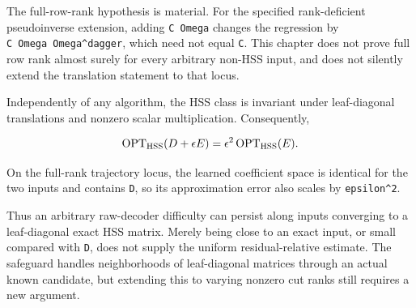 \documentclass[11pt,oneside,openany,a4paper]{book}
\numberwithin{equation}{chapter}
\theoremstyle{definition}
\theoremstyle{remark}
\newcommand{\proofstep}[1]{\par\addvspace{.45\baselineskip}\Needspace{3\baselineskip}\textbf{#1}\par\nobreak}
\newcommand{\R}{\mathbb R}\newcommand{\E}{\mathbb E}\newcommand{\Prb}{\mathbb P}\newcommand{\PP}{\mathbb P}
\newcommand{\T}{\mathsf T}\newcommand{\Id}{I}
\newcommand{\F}[1]{\left\lVert#1\right\rVert_F}
\newcommand{\N}[1]{\left\lVert#1\right\rVert}
\newcommand{\op}[1]{\left\lVert#1\right\rVert_{\rm op}}
\newcommand{\ip}[2]{\left\langle#1,#2\right\rangle_F}
\DeclareMathOperator{\tr}{tr}\DeclareMathOperator{\rank}{rank}
\DeclareMathOperator{\diag}{blockdiag}\DeclareMathOperator{\range}{range}
\DeclareMathOperator{\HSS}{HSS}\DeclareMathOperator{\dist}{dist}
\DeclareMathOperator{\Var}{Var}\DeclareMathOperator{\supp}{supp}
\newcommand{\UC}{\mathcal U}\newcommand{\VC}{\mathcal V}\newcommand{\err}{\mathcal E}
\newcommand{\Sn}[2]{\left\lVert#1\right\rVert_{S_{#2}}}
\newcommand{\Cov}{\mathsf C}\newcommand{\Loss}{\mathsf L}\newcommand{\Fil}{\mathcal F}
\DeclareMathOperator{\diver}{div}\DeclareMathOperator{\vecop}{vec}\DeclareMathOperator{\Gammafun}{Gamma}
\begin{document}
The full-row-rank hypothesis is material. For the specified rank-deficient pseudoinverse extension, adding \texttt{C\ Omega} changes the regression by \texttt{C\ Omega\ Omega\^{}dagger}, which need not equal \texttt{C}. This chapter does not prove full row rank almost surely for every arbitrary non-HSS input, and does not silently extend the translation statement to that locus.

Independently of any algorithm, the HSS class is invariant under leaf-diagonal translations and nonzero scalar multiplication. Consequently,

\[
 \operatorname{OPT}_{\rm HSS}(D+\epsilon E)
 =\epsilon^2\operatorname{OPT}_{\rm HSS}(E).
\]

On the full-rank trajectory locus, the learned coefficient space is identical for the two inputs and contains \texttt{D}, so its approximation error also scales by \texttt{epsilon\^{}2}.

Thus an arbitrary raw-decoder difficulty can persist along inputs converging to a leaf-diagonal exact HSS matrix. Merely being close to an exact input, or small compared with \texttt{\textbar{}\textbar{}D\textbar{}\textbar{}}, does not supply the uniform residual-relative estimate. The safeguard handles neighborhoods of leaf-diagonal matrices through an actual known candidate, but extending this to varying nonzero cut ranks still requires a new argument.

\endgroup

\begingroup
\let\R\relax
\newcommand{\R}{\mathbb R}
\let\E\relax
\newcommand{\E}{\mathbb E}
\let\Prb\relax
\newcommand{\Prb}{\mathbb P}
\let\T\relax
\newcommand{\T}{\mathsf T}
\let\F\relax
\newcommand{\F}[1]{\left\lVert#1\right\rVert_{F}}
\let\N\relax
\newcommand{\N}[1]{\left\lVert#1\right\rVert}
\let\ip\relax
\newcommand{\ip}[2]{\left\langle#1,#2\right\rangle_F}
\let\tr\relax
\newcommand{\tr}{\operatorname{tr}}
\let\rank\relax
\newcommand{\rank}{\operatorname{rank}}
\let\diag\relax
\newcommand{\diag}{\operatorname{blockdiag}}
\let\range\relax
\newcommand{\range}{\operatorname{range}}
\let\OPT\relax
\newcommand{\OPT}{\operatorname{OPT}}
\let\HSS\relax
\newcommand{\HSS}{\operatorname{HSS}}
\let\diver\relax
\newcommand{\diver}{\operatorname{div}}
\let\Var\relax
\newcommand{\Var}{\operatorname{Var}}
\let\UC\relax
\newcommand{\UC}{\mathcal U}
\let\VC\relax
\newcommand{\VC}{\mathcal V}
\let\err\relax
\newcommand{\err}{\mathcal E}
\let\proofstep\relax
\newcommand{\proofstep}[1]{\par\addvspace{.45\baselineskip}\Needspace{3\baselineskip}\textbf{#1}\par\nobreak}
\let\op\relax
\newcommand{\op}[1]{\left\lVert#1\right\rVert_{\mathrm{op}}}
\let\Sn\relax
\newcommand{\Sn}[2]{\left\lVert#1\right\rVert_{S_{#2}}}
\let\Cov\relax
\newcommand{\Cov}{\mathsf C}
\let\Loss\relax
\newcommand{\Loss}{\mathsf L}
\let\Fil\relax
\newcommand{\Fil}{\mathcal F}
\let\Id\relax
\newcommand{\Id}{I}
\let\supp\relax
\newcommand{\supp}{\operatorname{supp}}
\let\vecop\relax
\newcommand{\vecop}{\operatorname{vec}}
\let\Gammafun\relax
\newcommand{\Gammafun}{\operatorname{Gamma}}
\end{document}
